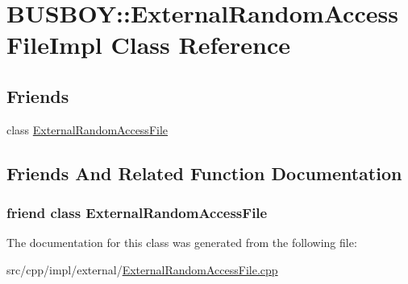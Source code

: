 \hypertarget{classBUSBOY_1_1ExternalRandomAccessFileImpl}{
\section{BUSBOY::ExternalRandomAccessFileImpl Class Reference}
\label{classBUSBOY_1_1ExternalRandomAccessFileImpl}
}
\subsection*{Friends}
\begin{DoxyCompactItemize}
\item 
class \hyperlink{classBUSBOY_1_1ExternalRandomAccessFileImpl_abf3254fa15c11520260afa94d18f943d}{ExternalRandomAccessFile}
\end{DoxyCompactItemize}


\subsection{Friends And Related Function Documentation}
\hypertarget{classBUSBOY_1_1ExternalRandomAccessFileImpl_abf3254fa15c11520260afa94d18f943d}{
\subsubsection[{ExternalRandomAccessFile}]{\setlength{\rightskip}{0pt plus 5cm}friend class {\bf ExternalRandomAccessFile}}}
\label{classBUSBOY_1_1ExternalRandomAccessFileImpl_abf3254fa15c11520260afa94d18f943d}


The documentation for this class was generated from the following file:\begin{DoxyCompactItemize}
\item 
src/cpp/impl/external/\hyperlink{ExternalRandomAccessFile_8cpp}{ExternalRandomAccessFile.cpp}\end{DoxyCompactItemize}
